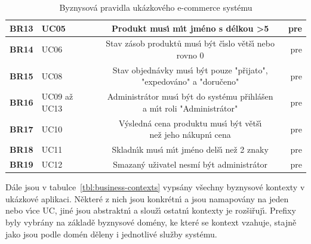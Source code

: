 \begin{table}
\begin{tabular}{ l l c r }
        \textbf{BR13} & UC05 & Produkt mus\'{\i} m\'{\i}t jméno s délkou >5 & pre \\ \hline
        \textbf{BR14} & UC06 & Stav zásob produktů mus\'{\i} b\'yt č\'{\i}slo větš\'{\i} nebo rovno 0 & pre \\ \hline
        \textbf{BR15} & UC08 & \makecell[c]{Stav objednávky mus\'{\i} b\'yt pouze "přijato", \\ "expedováno" a "doručeno"} & pre \\ \hline
        \textbf{BR16} & UC09 až UC13 & \makecell[c]{Administrátor mus\'{\i} b\'yt do systému přihlášen \\ a m\'{\i}t roli "Administrátor"} & pre \\ \hline
        \textbf{BR17} & UC10 & \makecell[c]{V\'ysledná cena produktu mus\'{\i} b\'yt větš\'{\i} \\ než jeho nákupn\'{\i} cena} & pre \\ \hline
        \textbf{BR18} & UC11 & Skladn\'{\i}k mus\'{\i} m\'{\i}t jméno delš\'{\i} než 2 znaky & pre \\ \hline
        \textbf{BR19} & UC12 & Smazaný uživatel nesmí být administrátor & pre \\ \hline
        \hline
    \end{tabular}
    \caption{Byznysová pravidla ukázkového e-commerce systému}
    \label{tbl:business-rules}
\end{table}

Dále jsou v tabulce~\ref{tbl:business-contexts} vypsány všechny byznysové kontexty v ukázkové aplikaci.
Některé z nich jsou konkrétn\'{\i} a jsou namapovány na jeden nebo v\'{\i}ce \gls{UC},
jiné jsou abstraktn\'{\i} a slouž\'{\i} ostatn\'{\i} kontexty je rozšiřuj\'{\i}.
Prefixy byly vybrány na základě byznysové domény, ke které se kontext vzahuje, stajně jako
jsou podle domén děleny i jednotlivé služby systému.

